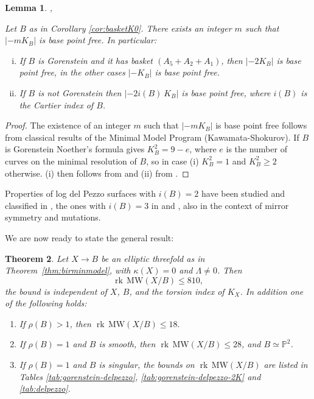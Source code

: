 \documentclass[11pt]{amsart}
\newtheorem{theorem}{Theorem}[section]
\newtheorem{lemma}[theorem]{Lemma}
\theoremstyle{definition}
\theoremstyle{definition}
\theoremstyle{remark}
\theoremstyle{remark}
\theoremstyle{definition}
\theoremstyle{conjecture}
\newcommand{\MW}{\mathrm{MW}}
\begin{document}
\begin{lemma}\cite{Demazure1980_PezzoIV}, \cite{FujinoBPFree}\label{lemma:bpfIndex}~

Let $B$ as in Corollary \ref{cor:basketK0}. There exists an integer $m$ such that  $|-m K_B|$  is base point free. In particular:
\begin{enumerate}[(i)]
    \item  If $B$ is Gorenstein and it has basket $(A_5+A_2+A_1)$, then $|-2K_B|$ is base point free, in the other cases $|-K_B|$ is base point free.
\item If $B$ is not Gorenstein  then $|-2 i(B) \ K_B|$ is base point free, where $i(B)$ is the Cartier index of $B$.
\end{enumerate}
    
\end{lemma}

\begin{proof} The existence of  an integer  $m$  such that  $|-m K_B|$  is base point free  follows from classical results of the Minimal Model Program (Kawamata-Shokurov). 
  If $B$ is Gorenstein Noether's formula gives $K_B^2= 9 -e $, where $e$ is the number of curves on the minimal resolution of $B$, so in case (i) $K_B^2=1$ and  $K_B^2 \geq 2$ otherwise. 
(i)  then follows from  \cite[Theorem 1, IV]{Demazure1980_PezzoIV} and (ii) from \cite[Corollary 1.5]{FujinoBPFree}. \end{proof}
Properties of log del Pezzo surfaces with $i(B)=2$  have been studied and classified in \cite{AlexeevNikulin}, the ones with $i(B)=3$  in \cite{FujitaYasutake}  and \cite{CortiHeuberger}, also in the context of mirror symmetry and mutations.

We are now ready to state the general result:

\begin{theorem}\label{thm:boundKodZero3}
Let \( X \to B \) be an elliptic threefold as in Theorem~\ref{thm:birminmodel}, with \( \kappa(X)=0 \) and \( \Lambda \neq 0 \). 
Then \[\operatorname{rk}\,\MW(X/B) \leq 810,\]
 the bound is independent of $X$, $B$, and the torsion index of $K_X$.
In addition one of the following holds:
\begin{enumerate}
    \item If \( \rho(B)>1 \), then
   $ \operatorname{rk}\,\MW(X/B) \leq 18.$
    \item If $\rho(B)=1 $ and $B$ is smooth, then  $\operatorname{rk}\,\MW(X/B) \leq 28$, and  $B \simeq \mathbb{P}^2$. 
    \item If   \( \rho(B)=1 \) and $B$ is singular,  the bounds on $\operatorname{rk}\,\MW(X/B) $ are listed in Tables \ref{tab:gorenstein-delpezzo}, \ref{tab:gorenstein-delpezzo-2K} and \ref{tab:delpezzo}.
\end{enumerate} 

\end{theorem}
\end{document}
